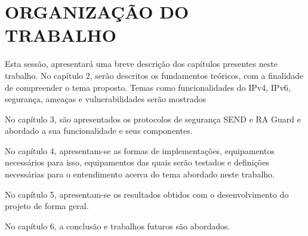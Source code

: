\section{ORGANIZAÇÃO DO TRABALHO}\label{sec:organizacao-trabalho}

Esta sessão, apresentará uma breve descrição dos capítulos presentes neste trabalho.
No capítulo 2, serão descritos os fundamentos teóricos, com a finalidade de compreender o tema proposto. Temas como funcionalidades do IPv4, IPv6, segurança, ameaças e vulnerabilidades serão mostrados

No capítulo 3, são apresentados os protocolos de segurança SEND e RA Guard e abordado a sua funcionalidade e seus componentes.

No capítulo 4, apresentam-se as formas de implementações, equipamentos necessários para isso, equipamentos das quais serão testados e definições necessárias para o entendimento acerca do tema abordado neste trabalho.

No capítulo 5, apresentam-se os resultados obtidos com o desenvolvimento do projeto de forma geral.

No capítulo 6, a conclusão e trabalhos futuros são abordados.
